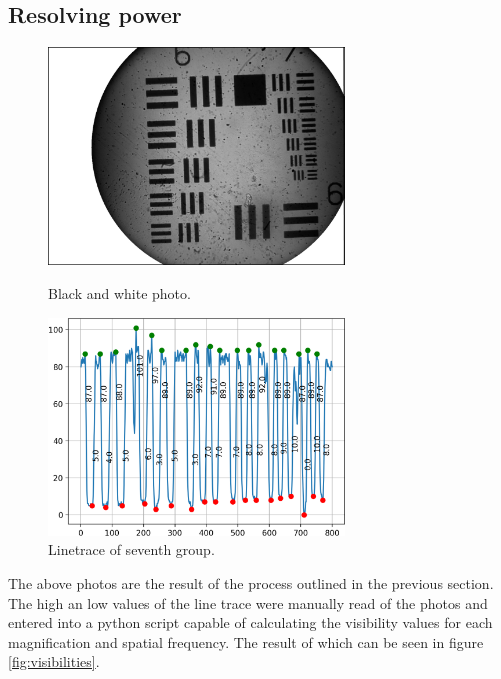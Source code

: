 \subsection{Resolving power}
\begin{figure}[h!]
    \centering
    \begin{minipage}{.5\textwidth}
      \centering
      \includegraphics[width=0.7\textwidth,keepaspectratio]{afbeeldingen/process_visibility/m3_bw.jpg}
      \caption{Black and white photo.}
      \label{fig:resolution_target}
    \end{minipage}%
    \begin{minipage}{.5\textwidth}
      \centering
      \includegraphics[width=0.7\textwidth,keepaspectratio]{afbeeldingen/process_visibility/m3_rpg_7.png}
      \caption{Linetrace of seventh group.}
      \label{fig:linetrace}
    \end{minipage}
\end{figure}

The above photos are the result of the process outlined in the previous section. The high an low values of the line trace were manually read of the photos and entered into a python script capable of calculating the visibility values for each magnification and spatial frequency. The result of which can be seen in figure \ref{fig:visibilities}.\\

